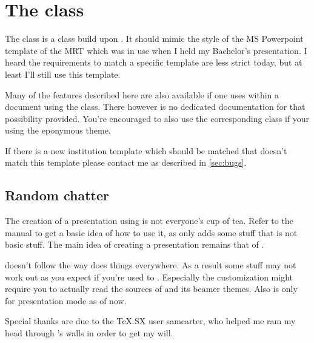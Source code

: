 \chapter{The  class}
The  class is a class build upon . It should mimic the
style of the MS Powerpoint template of the MRT which was in use when I held my
Bachelor's presentation. I heard the requirements to match a specific
template are less strict today, but at least I'll still use this template.

Many of the features described here are also available if one uses
 within a document using the  class. There
however is no dedicated documentation for that possibility provided. You're
encouraged to also use the corresponding  class if your using the
eponymous theme.

If there is a new institution template which should be matched that doesn't
match this  template please contact me as described in
\autoref{sec:bugs}.

\section{Random chatter}
The creation of a presentation using  is not everyone's cup of tea.
Refer to the  manual to get a basic idea of how to use it, as
 only adds some stuff that is not basic  stuff. The
main idea of creating a presentation remains that of .

 doesn't follow the way  does things everywhere. As a
result some stuff may not work out as you expect if you're used to .
Especially the customization might require you to actually read the sources of
 and its beamer themes. Also  is only for presentation
mode as of now.

Special thanks are due to the TeX.SX user samcarter, who helped me ram my head
through 's walls in order to get my will.

